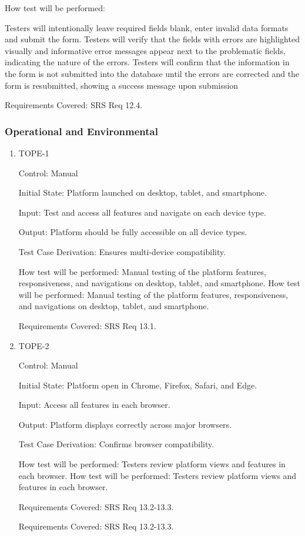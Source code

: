 \documentclass[12pt, titlepage]{article}
\begin{document}
\begin{enumerate}
        How test will be performed:

Testers will intentionally leave required fields blank, enter invalid data formats  and submit the form. Testers will verify that the fields with errors are highlighted visually and informative error messages appear next to the problematic fields, indicating the nature of the errors. Testers will confirm that the information in the form is not submitted into the database until the errors are corrected and the form is resubmitted, showing a success message upon submission

Requirements Covered: SRS Req 12.4.

\end{enumerate}


\subsubsection{Operational and Environmental}

\begin{enumerate}

  \item{TOPE-1\\}

        Control: Manual

        Initial State: Platform launched on desktop, tablet, and smartphone.

        Input: Test and access all features and navigate on each device type.

        Output: Platform should be fully accessible on all device types.

        Test Case Derivation: Ensures multi-device compatibility.

        How test will be performed: Manual testing of the platform features, responsiveness, and navigations on desktop, tablet, and smartphone.
How test will be performed: Manual testing of the platform features, responsiveness, and navigations on desktop, tablet, and smartphone.

Requirements Covered: SRS Req 13.1.

\item{TOPE-2\\}

        Control: Manual

        Initial State: Platform open in Chrome, Firefox, Safari, and Edge.

        Input: Access all features in each browser.

        Output: Platform displays correctly across major browsers.

        Test Case Derivation: Confirms browser compatibility.

        How test will be performed: Testers review platform views and features in each browser.
How test will be performed: Testers review platform views and features in each browser.

Requirements Covered: SRS Req 13.2-13.3.

        Requirements Covered: SRS Req 13.2-13.3.

\end{enumerate}
\end{document}
